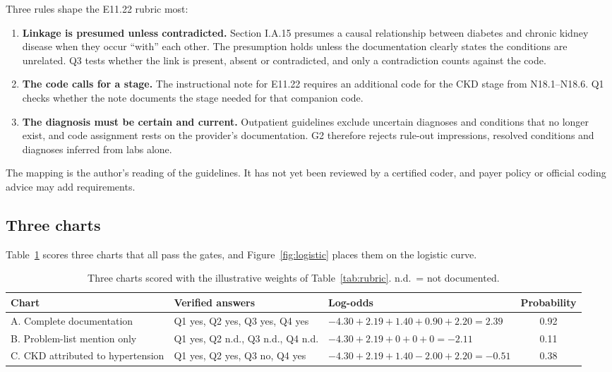 \documentclass[10pt,letterpaper]{article}
\begin{document}
Three rules shape the E11.22 rubric most:
\begin{enumerate}
  \item \textbf{Linkage is presumed unless contradicted.} Section I.A.15 presumes a causal relationship between diabetes and chronic kidney disease when they occur ``with'' each other. The presumption holds unless the documentation clearly states the conditions are unrelated. Q3 tests whether the link is present, absent or contradicted, and only a contradiction counts against the code.
  \item \textbf{The code calls for a stage.} The instructional note for E11.22 requires an additional code for the CKD stage from N18.1--N18.6. Q1 checks whether the note documents the stage needed for that companion code.
  \item \textbf{The diagnosis must be certain and current.} Outpatient guidelines exclude uncertain diagnoses and conditions that no longer exist, and code assignment rests on the provider's documentation. G2 therefore rejects rule-out impressions, resolved conditions and diagnoses inferred from labs alone.
\end{enumerate}
The mapping is the author's reading of the guidelines. It has not yet been reviewed by a certified coder, and payer policy or official coding advice may add requirements.

\FloatBarrier
\subsection{Three charts}

Table~\ref{tab:three} scores three charts that all pass the gates, and Figure~\ref{fig:logistic} places them on the logistic curve.

\begin{table}[!htbp]
\centering\small
\caption{Three charts scored with the illustrative weights of Table~\ref{tab:rubric}. n.d.\ = not documented.}\label{tab:three}
\begin{tabularx}{\textwidth}{@{}p{3.2cm}p{3.2cm}Lc@{}}
\toprule
Chart & Verified answers & Log-odds & Probability \\
\midrule
A. Complete documentation & Q1 yes, Q2 yes, Q3 yes, Q4 yes & $-4.30+2.19+1.40+0.90+2.20=2.39$ & 0.92 \\
B. Problem-list mention only & Q1 yes, Q2 n.d., Q3 n.d., Q4 n.d. & $-4.30+2.19+0+0+0=-2.11$ & 0.11 \\
C. CKD attributed to hypertension & Q1 yes, Q2 yes, Q3 no, Q4 yes & $-4.30+2.19+1.40-2.00+2.20=-0.51$ & 0.38 \\
\bottomrule
\end{tabularx}
\end{table}
\end{document}
